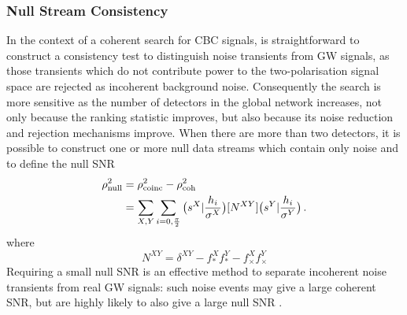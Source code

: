 \documentclass[binding=0.6cm, LaM]{sapthesis}
\begin{document}
\subsubsection{Null Stream Consistency}
\label{subsubsec:nullsnr}
	In the context of a coherent search for CBC signals,
	is straightforward to construct a consistency test to distinguish noise transients from GW signals,
	as those transients which do not contribute power to the two-polarisation signal space are rejected as incoherent background noise. 
	Consequently the search is more sensitive as the number of detectors in the global network increases, 
	not only because the ranking statistic improves, but also because its noise reduction and rejection mechanisms improve. 
	When there are more than two detectors, it is possible to construct one or more null data streams 
	which contain only noise and to define the null SNR 
        \begin{align}
          \label{eq:rhonull}
          \rho^2_{\rm null} &= \rho^2_{\rm coinc} - \rho^2_{\rm coh} \\
          &= \sum_{X,Y}\sum_{i=0,{{\pi}\over{2}}}  \big(s^X|{{h_i}\over{\sigma^X}}\big)[N^{XY}]\big( s^Y|{{h_i}\over{\sigma^Y}}\big)\,. 
        \end{align}
	where
        \begin{equation}
          N^{XY} = \delta^{XY}-f^X_*f^Y_* - f^X_{\times}f^Y_{\times}
        \end{equation}
	Requiring a small null SNR is an effective method to separate incoherent noise transients from real GW signals: 
	such noise events may give a large coherent SNR, but are highly likely to also give a large null SNR \cite{45}.
\end{document}
